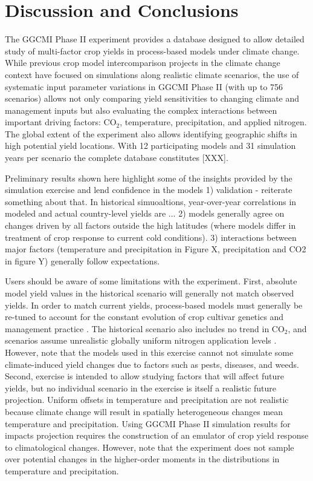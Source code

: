 \documentclass[gmd, manuscript]{copernicus} %
\begin{document}
\section{Discussion and Conclusions} 
\label{S:5}
The GGCMI Phase II experiment provides a database designed to allow detailed study of multi-factor crop yields in process-based models under climate change. While previous crop model intercomparison projects in the climate change context have focused on simulations along realistic climate scenarios,
the use of systematic input parameter variations in GGCMI Phase II (with up to 756 scenarios) allows not only comparing yield sensitivities to changing climate and management inputs but also evaluating the complex interactions between important driving factors: CO$_2$, temperature, precipitation, and applied nitrogen. 
The global extent of the experiment also allows identifying geographic shifts in high potential yield locations. 
With 12 participating models and 31 simulation years per scenario the complete database constitutes [XXX]. 

Preliminary results shown here highlight some of the insights provided by the simulation exercise and lend confidence in the models
1) validation - reiterate something about that. In historical simuoaltions, year-over-year correlations in modeled and actual country-level yields are ... 
2) models generally agree on changes driven by all factors outside the high latitudes (where models differ in treatment of crop response to current cold conditions).
3) interactions between major factors (temperature and precipitation in Figure X, precipitation and CO2 in figure Y) generally follow expectations.

Users should be aware of some limitations with the experiment. 
First, absolute model yield values in the historical scenario will generally not match observed yields.  
In order to match current yields, process-based models must generally be re-tuned to account for the constant evolution of crop cultivar genetics and  management practice \citep[e.g.][]{JONES2017b}. The historical scenario also includes no trend in CO$_2$, and scenarios assume unrealistic globally uniform nitrogen application levels \citep{Elliott2015}.
However, note that the models used in this exercise cannot not simulate some climate-induced yield changes due to factors such as pests, diseases, and weeds. 
Second, exercise is intended to allow studying factors that will affect future yields, but no individual scenario in the exercise is itself a realistic future projection.
Uniform offsets in temperature and precipitation are not realistic because climate change will result in spatially heterogeneous changes mean temperature and precipitation. 
Using GGCMI Phase II simulation results for impacts projection requires the construction of an emulator of crop yield response to climatological changes. 
However, note that the experiment does not sample over potential changes in the higher-order moments in the distributions in temperature and precipitation. 
\end{document}
